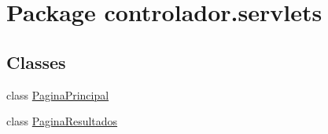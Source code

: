 \hypertarget{namespacecontrolador_1_1servlets}{}\section{Package controlador.\+servlets}
\label{namespacecontrolador_1_1servlets}
\subsection*{Classes}
\begin{DoxyCompactItemize}
\item 
class \hyperlink{classcontrolador_1_1servlets_1_1PaginaPrincipal}{Pagina\+Principal}
\item 
class \hyperlink{classcontrolador_1_1servlets_1_1PaginaResultados}{Pagina\+Resultados}
\end{DoxyCompactItemize}
